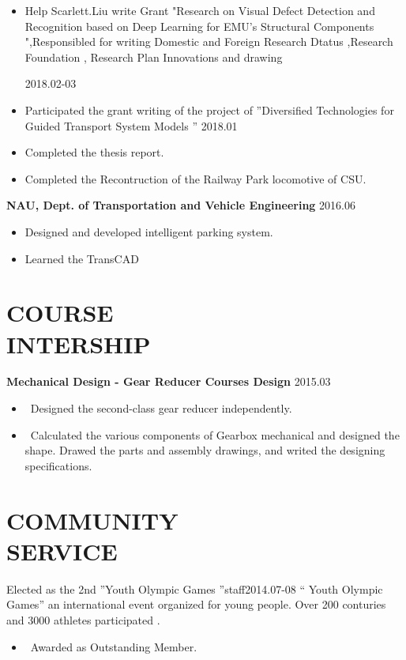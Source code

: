 \documentclass[margin]{res}
\begin{document}
\begin{resume}
                 \begin{itemize}  
                 \itemsep -2pt %
                \item  Help Scarlett.Liu write Grant "Research on Visual Defect Detection and Recognition based on Deep Learning for EMU's Structural Components 
",Responsibled for writing Domestic and Foreign Research Dtatus ,Research Foundation , Research Plan Innovations and drawing              
                 
                 \hfill 2018.02-03       \item  Participated the grant writing of the project of ''Diversified Technologies for Guided Transport System Models  '' \hfill 2018.01
                \item   Completed the thesis report.
                \item   Completed the Recontruction of  the Railway Park locomotive of CSU.
                \end{itemize}
 
               \textbf { NAU, Dept. of Transportation and Vehicle Engineering   } \hfill 2016.06
                 \begin{itemize}  \itemsep -2pt %
                 \item Designed and developed intelligent parking system.
                 \item Learned the TransCAD 
                 \end{itemize} 

               
               
\section{COURSE \\ INTERSHIP}  \textbf {Mechanical Design - Gear Reducer Courses Design} \hfill{2015.03}
\begin{itemize}  
                 \item \ Designed the second-class gear reducer independently. 
                 \item \ Calculated the various components of Gearbox mechanical and designed the shape. Drawed the parts and assembly drawings, and writed the designing specifications.
                 \end{itemize} 



\section{COMMUNITY \\ SERVICE}  Elected as the 2nd ''Youth Olympic Games ''staff\hfill{2014.07-08}
                 \newline `` Youth Olympic Games''  an international event organized for young people. Over 200 conturies and 3000 athletes participated . 
  \begin{itemize}  
  \item \ Awarded as Outstanding Member.
   \end{itemize} 

\end{resume}
\end{document}
